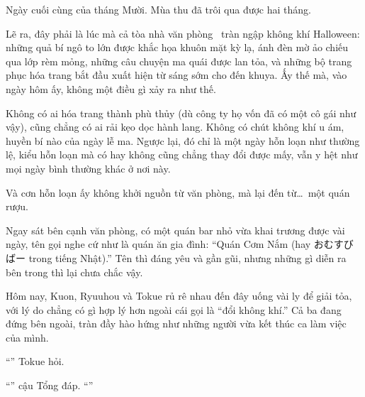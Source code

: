 \documentclass[../main.tex]{subfiles}
\begin{document}

Ngày cuối cùng của tháng Mười. Mùa thu đã trôi qua được hai tháng.

Lẽ ra, đây phải là lúc mà cả tòa nhà văn phòng \hll\ tràn ngập không khí Halloween: những quả bí ngô to lớn được khắc họa khuôn mặt kỳ lạ, ánh đèn mờ ảo chiếu qua lớp rèm mỏng, những câu chuyện ma quái được lan tỏa, và những bộ trang phục hóa trang bắt đầu xuất hiện từ sáng sớm cho đến khuya. Ấy thế mà, vào ngày hôm ấy, không một điều gì xảy ra như thế.

Không có ai hóa trang thành phù thủy (dù công ty họ vốn đã có một cô gái như vậy), cũng chẳng có ai rải kẹo dọc hành lang. Không có chút không khí u ám, huyền bí nào của ngày lễ ma. Ngược lại, đó chỉ là một ngày hỗn loạn như thường lệ, kiểu hỗn loạn mà có hay không cũng chẳng thay đổi được mấy, vẫn y hệt như mọi ngày bình thường khác ở nơi này.

Và cơn hỗn loạn ấy không khởi nguồn từ văn phòng, mà lại đến từ\dots\ một quán rượu.

Ngay sát bên cạnh văn phòng, có một quán bar nhỏ vừa khai trương được vài ngày, tên gọi nghe cứ như là quán ăn gia đình: ``Quán Cơm Nắm (hay おむすびばー trong tiếng Nhật).'' Tên thì đáng yêu và gần gũi, nhưng những gì diễn ra bên trong thì lại chưa chắc vậy.

Hôm nay, Kuon, Ryuuhou và Tokue rủ rê nhau đến đây uống vài ly để giải tỏa, với lý do chẳng có gì hợp lý hơn ngoài cái gọi là ``đổi không khí.'' Cả ba đang đứng bên ngoài, tràn đầy hào hứng như những người vừa kết thúc ca làm việc của mình.

``'' Tokue hỏi.

``'' cậu Tổng đáp. ``''
\end{document}
